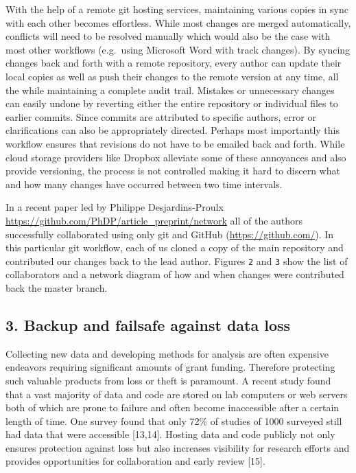 \documentclass[]{article}
\begin{document}
With the help of a remote git hosting services, maintaining various
copies in sync with each other becomes effortless. While most changes
are merged automatically, conflicts will need to be resolved manually
which would also be the case with most other workflows (e.g.~using
Microsoft Word with track changes). By syncing changes back and forth
with a remote repository, every author can update their local copies as
well as push their changes to the remote version at any time, all the
while maintaining a complete audit trail. Mistakes or unnecessary
changes can easily undone by reverting either the entire repository or
individual files to earlier commits. Since commits are attributed to
specific authors, error or clarifications can also be appropriately
directed. Perhaps most importantly this workflow ensures that revisions
do not have to be emailed back and forth. While cloud storage providers
like Dropbox alleviate some of these annoyances and also provide
versioning, the process is not controlled making it hard to discern what
and how many changes have occurred between two time intervals.

In a recent paper led by Philippe Desjardins-Proulx
\href{https://github.com/PhDP/article\_preprint/network}{https://github.com/PhDP/article\_preprint/network}
all of the authors successfully collaborated using only git and GitHub
(\href{{[}@Vink2012b{]}}{https://github.com/}). In this particular git
workflow, each of us cloned a copy of the main repository and
contributed our changes back to the lead author. Figures \texttt{2} and
\texttt{3} show the list of collaborators and a network diagram of how
and when changes were contributed back the master branch.

\subsection{3. Backup and failsafe against data loss}

Collecting new data and developing methods for analysis are often
expensive endeavors requiring significant amounts of grant funding.
Therefore protecting such valuable products from loss or theft is
paramount. A recent study found that a vast majority of data and code
are stored on lab computers or web servers both of which are prone to
failure and often become inaccessible after a certain length of time.
One survey found that only 72\% of studies of 1000 surveyed still had
data that were accessible {[}13,14{]}. Hosting data and code publicly
not only ensures protection against loss but also increases visibility
for research efforts and provides opportunities for collaboration and
early review {[}15{]}.
\end{document}
